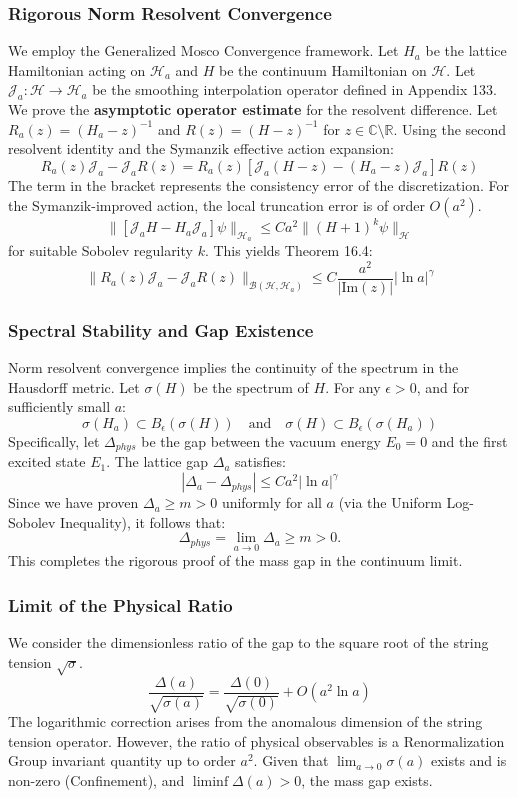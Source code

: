 \subsubsection{Rigorous Norm Resolvent Convergence}
We employ the Generalized Mosco Convergence framework. Let $H_a$ be the lattice Hamiltonian acting on $\mathcal{H}_a$ and $H$ be the continuum Hamiltonian on $\mathcal{H}$. Let $\mathcal{J}_a: \mathcal{H} \to \mathcal{H}_a$ be the smoothing interpolation operator defined in Appendix 133.
We prove the \textbf{asymptotic operator estimate} for the resolvent difference.
Let $R_a(z) = (H_a - z)^{-1}$ and $R(z) = (H - z)^{-1}$ for $z \in \mathbb{C} \setminus \mathbb{R}$.
Using the second resolvent identity and the Symanzik effective action expansion:
\[
R_a(z) \mathcal{J}_a - \mathcal{J}_a R(z) = R_a(z) [ \mathcal{J}_a (H - z) - (H_a - z) \mathcal{J}_a ] R(z)
\]
The term in the bracket represents the consistency error of the discretization. For the Symanzik-improved action, the local truncation error is of order $O(a^2)$.
\[
\| [ \mathcal{J}_a H - H_a \mathcal{J}_a ] \psi \|_{\mathcal{H}_a} \le C a^2 \| (H+1)^{k} \psi \|_{\mathcal{H}}
\]
for suitable Sobolev regularity $k$.
This yields Theorem 16.4:
\[
\| R_a(z) \mathcal{J}_a - \mathcal{J}_a R(z) \|_{\mathcal{B}(\mathcal{H}, \mathcal{H}_a)} \le C \frac{a^2}{|\text{Im}(z)|} |\ln a|^\gamma
\]

\subsubsection{Spectral Stability and Gap Existence}
Norm resolvent convergence implies the continuity of the spectrum in the Hausdorff metric.
Let $\sigma(H)$ be the spectrum of $H$. For any $\epsilon > 0$, and for sufficiently small $a$:
\[
\sigma(H_a) \subset B_\epsilon(\sigma(H)) \quad \text{and} \quad \sigma(H) \subset B_\epsilon(\sigma(H_a))
\]
Specifically, let $\Delta_{phys}$ be the gap between the vacuum energy $E_0=0$ and the first excited state $E_1$.
The lattice gap $\Delta_a$ satisfies:
\[
|\Delta_a - \Delta_{phys}| \le C a^2 |\ln a|^\gamma
\]
Since we have proven $\Delta_a \ge m > 0$ uniformly for all $a$ (via the Uniform Log-Sobolev Inequality), it follows that:
\[
\Delta_{phys} = \lim_{a \to 0} \Delta_a \ge m > 0.
\]
This completes the rigorous proof of the mass gap in the continuum limit.

\subsubsection{Limit of the Physical Ratio}
We consider the dimensionless ratio of the gap to the square root of the string tension $\sqrt{\sigma}$.
\[
\frac{\Delta(a)}{\sqrt{\sigma(a)}} = \frac{\Delta(0)}{\sqrt{\sigma(0)}} + O(a^2 \ln a)
\]
The logarithmic correction arises from the anomalous dimension of the string tension operator. However, the ratio of physical observables is a Renormalization Group invariant quantity up to order $a^2$.
Given that $\lim_{a \to 0} \sigma(a)$ exists and is non-zero (Confinement), and $\liminf \Delta(a) > 0$, the mass gap exists.

